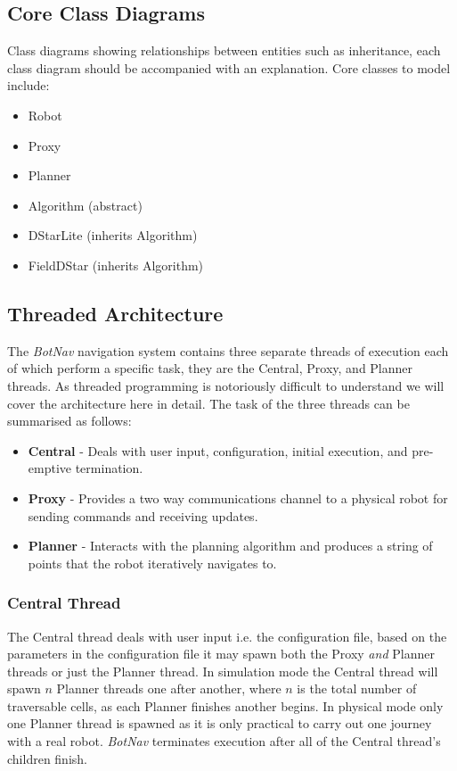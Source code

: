 \subsection{Core Class Diagrams}

\noindent
Class diagrams showing relationships between entities such as inheritance, each class diagram should be accompanied with an explanation. Core classes to model include:

\begin{itemize}
\item Robot
\item Proxy
\item Planner
\item Algorithm (abstract)
\item DStarLite (inherits Algorithm)
\item FieldDStar (inherits Algorithm)
\end{itemize} 

\newpage

\subsection{Threaded Architecture}

\noindent
The \textit{BotNav} navigation system contains three separate threads of execution each of which perform a specific task, they are the Central, Proxy, and Planner threads. As threaded programming is notoriously difficult to understand we will cover the architecture here in detail. The task of the three threads can be summarised as follows: 

\begin{itemize}
\item \textbf{Central} - Deals with user input, configuration, initial execution, and pre-emptive termination. 
\item \textbf{Proxy} - Provides a two way communications channel to a physical robot for sending commands and receiving updates.
\item \textbf{Planner} - Interacts with the planning algorithm and produces a string of points that the robot iteratively navigates to.
\end{itemize} 

\subsubsection*{Central Thread}
\noindent
The Central thread deals with user input i.e. the configuration file, based on the parameters in the configuration file it may spawn both the Proxy \textit{and} Planner threads or just the Planner thread. In simulation mode the Central thread will spawn $n$ Planner threads one after another, where $n$ is the total number of traversable cells, as each Planner finishes another begins. In physical mode only one Planner thread is spawned as it is only practical to carry out one journey with a real robot. \textit{BotNav} terminates execution after all of the Central thread's children finish. 

